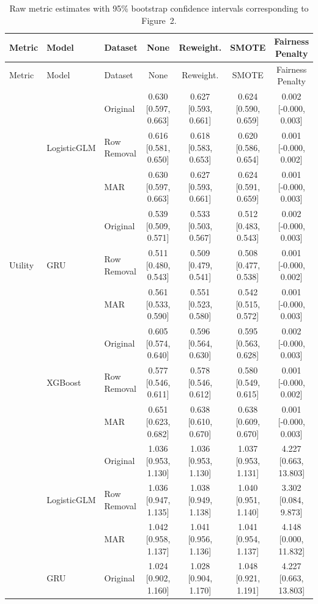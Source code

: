 \begin{longtable}{lllcccc}
\caption{Raw metric estimates with 95\% bootstrap confidence intervals corresponding to Figure~2.}\\
\toprule
Metric & Model & Dataset & None & Reweight. & SMOTE & Fairness Penalty \\
\midrule
\endfirsthead
\toprule
Metric & Model & Dataset & None & Reweight. & SMOTE & Fairness Penalty \\
\midrule
\endhead
\multirow{9}{*}{Utility} & \multirow{3}{*}{LogisticGLM} & Original & 0.630 [0.597, 0.663] & 0.627 [0.593, 0.661] & 0.624 [0.590, 0.659] & 0.002 [-0.000, 0.003] \\
 &  & Row Removal & 0.616 [0.581, 0.650] & 0.618 [0.583, 0.653] & 0.620 [0.586, 0.654] & 0.001 [-0.000, 0.002] \\
 &  & MAR & 0.630 [0.597, 0.663] & 0.627 [0.593, 0.661] & 0.624 [0.591, 0.659] & 0.001 [-0.000, 0.003] \\
\addlinespace
 & \multirow{3}{*}{GRU} & Original & 0.539 [0.509, 0.571] & 0.533 [0.503, 0.567] & 0.512 [0.483, 0.543] & 0.002 [-0.000, 0.003] \\
 &  & Row Removal & 0.511 [0.480, 0.543] & 0.509 [0.479, 0.541] & 0.508 [0.477, 0.538] & 0.001 [-0.000, 0.002] \\
 &  & MAR & 0.561 [0.533, 0.590] & 0.551 [0.523, 0.580] & 0.542 [0.515, 0.572] & 0.001 [-0.000, 0.003] \\
\addlinespace
 & \multirow{3}{*}{XGBoost} & Original & 0.605 [0.574, 0.640] & 0.596 [0.564, 0.630] & 0.595 [0.563, 0.628] & 0.002 [-0.000, 0.003] \\
 &  & Row Removal & 0.577 [0.546, 0.611] & 0.578 [0.546, 0.612] & 0.580 [0.549, 0.615] & 0.001 [-0.000, 0.002] \\
 &  & MAR & 0.651 [0.623, 0.682] & 0.638 [0.610, 0.670] & 0.638 [0.609, 0.670] & 0.001 [-0.000, 0.003] \\
\addlinespace
\multirow{9}{*}{Disparate Impact} & \multirow{3}{*}{LogisticGLM} & Original & 1.036 [0.953, 1.130] & 1.036 [0.953, 1.130] & 1.037 [0.953, 1.131] & 4.227 [0.663, 13.803] \\
 &  & Row Removal & 1.036 [0.947, 1.135] & 1.038 [0.949, 1.138] & 1.040 [0.951, 1.140] & 3.302 [0.084, 9.873] \\
 &  & MAR & 1.042 [0.958, 1.137] & 1.041 [0.956, 1.136] & 1.041 [0.954, 1.137] & 4.148 [0.000, 11.832] \\
\addlinespace
 & \multirow{3}{*}{GRU} & Original & 1.024 [0.902, 1.160] & 1.028 [0.904, 1.170] & 1.048 [0.921, 1.191] & 4.227 [0.663, 13.803] \\

\end{longtable}
